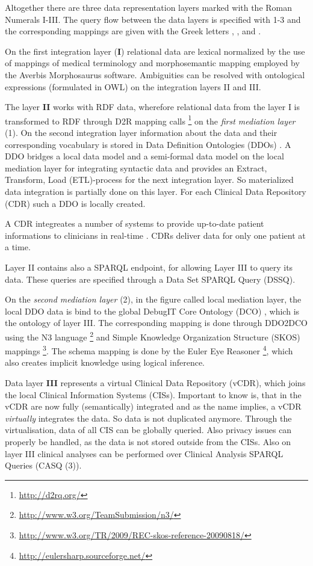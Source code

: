 Altogether there are three data representation layers marked with the Roman Numerals I-III. The query flow between the data layers is specified with 1-3 and the corresponding mappings are given with the Greek letters \textalpha , \textbeta,  and \textgamma .

On the first integration layer (\textbf{I}) relational data are lexical normalized by the use of mappings of medical terminology and morphosemantic mapping employed by the Averbis Morphosaurus software\cite{DaumkeDiss}. Ambiguities can be resolved with ontological expressions (formulated in OWL) on the integration layers II and III. 

The layer \textbf{II} works with RDF data, wherefore relational data from the layer I is transformed to RDF through D2R mapping calls \footnote{\url{http://d2rq.org/}} on the\emph{ first mediation layer} (1). On the second integration layer information about the data and their corresponding vocabulary is stored in Data Definition Ontologies (DDOs) \cite{DebugITDDO}. A DDO bridges a local data model and a semi-formal data model on the local mediation layer for integrating syntactic data and provides an Extract, Transform, Load (ETL)-process \cite[p. 382]{DBLP:books/dp/LeserN2006} for the next integration layer. So materialized data integration is partially done on this layer.
For each Clinical Data Repository (CDR) such a DDO is locally created. 

A CDR integreates a number of systems to provide up-to-date patient informations to clinicians in real-time \cite[p. 82]{carter2008electronic}. CDRs deliver data for only one patient at a time.

Layer II contains also a SPARQL endpoint, for allowing Layer III to query its data. These queries are specified through a Data Set SPARQL Query (DSSQ). 

On the \emph{second mediation layer} (2), in the figure called local mediation layer, the local DDO data is bind to the global DebugIT Core Ontology (DCO) \cite{Schober_developingdco:}, which is the ontology of layer III. The corresponding mapping is done through DDO2DCO using the N3 language \footnote{\url{http://www.w3.org/TeamSubmission/n3/}} and Simple Knowledge Organization Structure (SKOS) mappings \footnote{\url{http://www.w3.org/TR/2009/REC-skos-reference-20090818/}}. The schema mapping is done by the Euler Eye Reasoner \footnote{\url{http://eulersharp.sourceforge.net/}}, which also creates implicit knowledge using logical inference.

Data layer \textbf{III} represents a virtual Clinical Data Repository (vCDR), which joins the local Clinical Information Systems (CISs). Important to know is, that in the vCDR are now fully (semantically) integrated and as the name implies, a vCDR \emph{virtually} integrates the data. So data is not duplicated anymore. Through the virtualisation, data of all CIS can be globally queried. Also privacy issues can properly be handled, as the data is not stored outside from the CISs.
Also on layer III clinical analyses can be performed over Clinical Analysis SPARQL Queries (CASQ (3)). 


